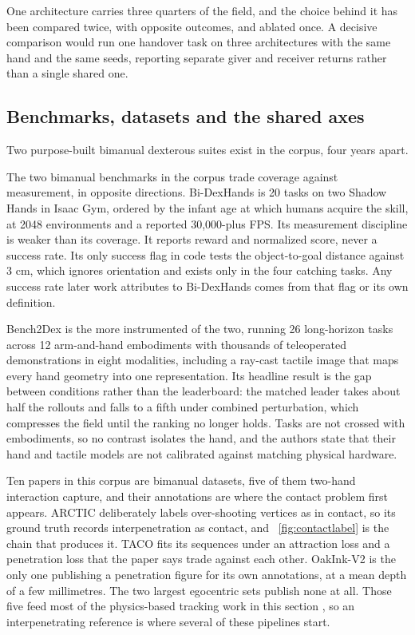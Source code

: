 One architecture carries three quarters of the field, and the choice
behind it has been compared twice, with opposite outcomes, and ablated once. A decisive comparison would run
one handover task on three architectures with the same hand and the same seeds, reporting
separate giver and receiver returns rather than a single shared one.

\subsection{Benchmarks, datasets and the shared axes}
\label{subsec:bimanual_benchmarks}

Two purpose-built bimanual dexterous suites exist in the corpus, four years apart.

The two bimanual benchmarks in the corpus trade coverage against measurement, in opposite
directions. Bi-DexHands \cite{bidexhands_2022} is 20 tasks on two Shadow Hands in Isaac Gym,
ordered by the infant age at which humans acquire the skill, at 2048 environments and a
reported 30,000-plus FPS. Its measurement discipline is weaker than its coverage. It reports
reward and normalized score, never a success rate. Its only success flag in code tests the
object-to-goal distance against 3 cm, which ignores orientation and exists only in the four
catching tasks. Any success rate later work attributes to Bi-DexHands comes from that flag or
its own definition.

Bench2Dex \cite{bench2dex_2026} is the more instrumented of the two, running 26 long-horizon
tasks across 12 arm-and-hand embodiments with thousands of teleoperated demonstrations in eight
modalities, including a ray-cast tactile image that maps every hand geometry into one
representation. Its headline result is the gap between conditions rather than the leaderboard: the
matched leader takes about half the rollouts and falls to a fifth under combined perturbation,
which compresses the field until the ranking no longer holds. Tasks are not crossed with
embodiments, so no contrast isolates the hand, and the authors state that their hand and tactile
models are not calibrated against matching physical hardware.

Ten papers in this corpus are bimanual datasets, five of them two-hand interaction capture, and
their annotations are where the contact problem first appears. ARCTIC \cite{arctic_2022}
deliberately labels over-shooting vertices as in contact, so its ground truth records
interpenetration as contact, and \figurename~\ref{fig:contactlabel} is the chain that produces it.
TACO \cite{taco_2024} fits its sequences under an attraction loss and a penetration loss that the
paper says trade against each other. OakInk-V2 \cite{oakink2_2024} is the only one publishing a
penetration figure for its own annotations, at a mean depth of a few millimetres. The two largest
egocentric sets \cite{hot3d_2024,gigahands_2024} publish none at all. Those five feed most of the
physics-based tracking work in this section
\cite{dexmachina_2025,artigrasp_2023,bidexhd_2024,maniptrans_2025,dexman_2025}, so an
interpenetrating reference is where several of these pipelines start.

